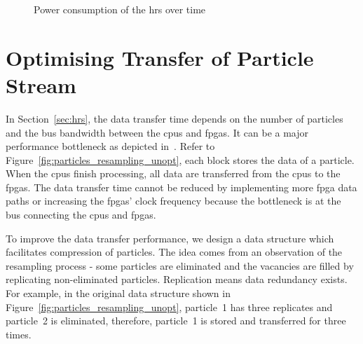 \setcounter{subfigure}{0}
\begin{figure}[t!]
\centering
{}
\caption{Power consumption of the \gls{hrs} over time}
\label{fig:timing}
\end{figure}

\section{Optimising Transfer of Particle Stream}
\label{sec:stream}

In Section~\ref{sec:hrs}, the data transfer time depends on the number of particles and the bus bandwidth between the \gls{cpu}s and \gls{fpga}s.
It can be a major performance bottleneck as depicted in~\cite{chau13a}.
Refer to Figure~\ref{fig:particles_resampling_unopt}, each block stores the data of a particle.
When the \gls{cpu}s finish processing, all data are transferred from the \gls{cpu}s to the \gls{fpga}s.
The data transfer time cannot be reduced by implementing more \gls{fpga} data paths or increasing the \gls{fpga}s' clock frequency because the bottleneck is at the bus connecting the \gls{cpu}s and \gls{fpga}s.

To improve the data transfer performance, we design a data structure which facilitates compression of particles.
The idea comes from an observation of the resampling process - some particles are eliminated and the vacancies are filled by replicating non-eliminated particles.
Replication means data redundancy exists.
For example, in the original data structure shown in Figure~\ref{fig:particles_resampling_unopt}, 
particle~1 has three replicates and particle~2 is eliminated, therefore, particle~1 is stored and transferred for three times.

